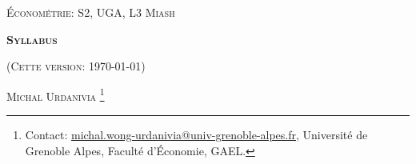 


\usepackage{tikz}



\usepackage{fancyhdr}
\pagestyle{fancy}
\fancyhead{}
\fancyfoot{} 
\fancyfoot[C]{\small{\thepage}}
\renewcommand{\footrulewidth}{0pt}



 
\usetikzlibrary{positioning}
\usetikzlibrary{snakes}
\usetikzlibrary{calc}
\usetikzlibrary{arrows}
\usetikzlibrary{decorations.markings}
\usetikzlibrary{shapes.misc}
\usetikzlibrary{shapes}

\begin{titlepage}
\centering
	{\scshape\Large \textsc{Économétrie: S2, UGA, L3 Miash}\par}
	\vspace{1cm}
	{\Large\bfseries \textsc{Syllabus} \par}
    \vspace{1cm}   
	{(\textsc{Cette version: \today})\par}
	\vspace{1cm}
	{\large \textsc{Michal Urdanivia}
	\footnote{Contact:  
	\href{mailto:michal.wong-urdanivia@univ-grenoble-alpes.fr}{michal.wong-urdanivia@univ-grenoble-alpes.fr}, 
	 Université de Grenoble Alpes,  Faculté d'\'Economie, GAEL.}\par}
	
\end{titlepage}

